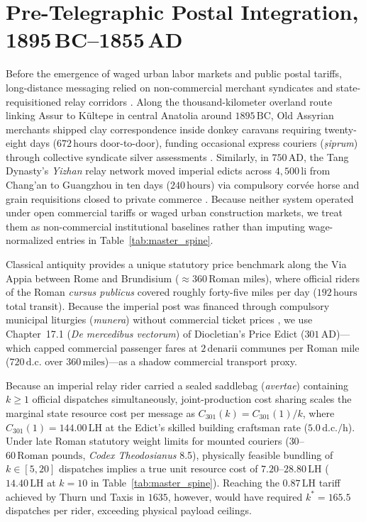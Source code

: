 \documentclass[11pt,a4paper]{article}
\begin{document}
\section{Pre-Telegraphic Postal Integration, 1895\,BC--1855\,AD}
\label{sec:pretelegraph}

Before the emergence of waged urban labor markets and public postal tariffs, long-distance messaging relied on non-commercial merchant syndicates and state-requisitioned relay corridors \citep{Innis1950}. Along the thousand-kilometer overland route linking Assur to K\"ultepe in central Anatolia around $1895\,\text{BC}$, Old Assyrian merchants shipped clay correspondence inside donkey caravans requiring twenty-eight days ($672\,\text{hours}$ door-to-door), funding occasional express couriers (\textit{\d{s}iprum}) through collective syndicate silver assessments \citep{Larsen1976,Dercksen2004,Veenhof2008}. Similarly, in $750\,\text{AD}$, the Tang Dynasty's \textit{Yizhan} relay network moved imperial edicts across $4,500\,\text{li}$ from Chang'an to Guangzhou in ten days ($240\,\text{hours}$) via compulsory corv\'ee horse and grain requisitions closed to private commerce \citep{Yan1969}. Because neither system operated under open commercial tariffs or waged urban construction markets, we treat them as non-commercial institutional baselines rather than imputing wage-normalized entries in Table~\ref{tab:master_spine}.

Classical antiquity provides a unique statutory price benchmark along the Via Appia between Rome and Brundisium ($\approx 360\,\text{Roman miles}$), where official riders of the Roman \textit{cursus publicus} covered roughly forty-five miles per day ($192\,\text{hours}$ total transit). Because the imperial post was financed through compulsory municipal liturgies (\textit{munera}) without commercial ticket prices \citep[Pliny, \textit{Epist.}\ 10.45;][]{Kolb2000}, we use Chapter~17.1 (\textit{De mercedibus vectorum}) of Diocletian's Price Edict ($301\,\text{AD}$)---which capped commercial passenger fares at $2\,\text{denarii communes}$ per Roman mile ($720\,\text{d.c.}$ over $360\,\text{miles}$)---as a shadow commercial transport proxy.

Because an imperial relay rider carried a sealed saddlebag (\textit{avertae}) containing $k \ge 1$ official dispatches simultaneously, joint-production cost sharing scales the marginal state resource cost per message as $C_{301}(k) = C_{301}(1) / k$, where $C_{301}(1) = 144.00\,\text{LH}$ at the Edict's skilled building craftsman rate ($5.0\,\text{d.c./h}$). Under late Roman statutory weight limits for mounted couriers ($30$--$60\,\text{Roman pounds}$, \textit{Codex Theodosianus} 8.5), physically feasible bundling of $k \in [5, 20]$ dispatches implies a true unit resource cost of $7.20$--$28.80\,\text{LH}$ ($14.40\,\text{LH}$ at $k = 10$ in Table~\ref{tab:master_spine}). Reaching the $0.87\,\text{LH}$ tariff achieved by Thurn und Taxis in $1635$, however, would have required $k^* = 165.5$ dispatches per rider, exceeding physical payload ceilings.
\end{document}
